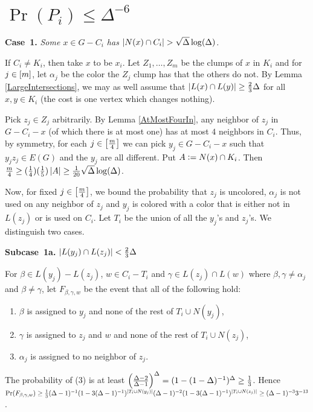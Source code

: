 \section{\texorpdfstring{$\Pr(P_i) \leq \Delta^{-6}$}{The P events}}
\textbf{Case~1.} \textit{Some $x \in G  - C_i$ has $\left|N(x) \cap C_i\right| >
\sqrt{\Delta}\log(\Delta)$.} 

If $C_i \neq K_i$, then take $x$ to be $x_i$. Let $Z_1, \ldots, Z_m$ be the
clumps of $x$ in $K_i$ and for $j \in \left[m\right]$, let $\alpha_j$ be the color
the $Z_j$ clump has that the others do not.  By Lemma \ref{LargeIntersections}, we may as well assume that $\left|L(x) \cap
L(y)\right| \geq \frac23 \Delta$ for all $x,y \in K_i$ (the cost is one vertex which
changes nothing).

Pick $z_j \in Z_j$ arbitrarily.  By Lemma \ref{AtMostFourIn}, any neighbor of
$z_j$ in $G - C_i - x$ (of which there is at most one) has at most $4$ neighbors
in $C_i$.  Thus, by symmetry, for each $j \in \left[\frac{m}{4}\right]$ we can pick
$y_j \in G - C_i - x$ such that $y_jz_j \in E(G)$ and the $y_j$ are all
different.  Put $A \mathrel{\mathop:}= N(x) \cap K_i$.  Then $\frac{m}{4} \geq
(\frac14)(\frac15)\left|A\right| \geq \frac{1}{20}\sqrt{\Delta}\log(\Delta)$.

Now, for fixed $j \in \left[\frac{m}{4}\right]$, we bound the probability that $z_j$
is uncolored, $\alpha_j$ is not used on any neighbor of $z_j$ and $y_j$ is colored
with a color that is either not in $L(z_j)$ or is used on $C_i$.  Let $T_i$ be
the union of all the $y_j$'s and $z_j$'s. We distinguish two cases.

\textbf{Subcase~1a.} \textit{$\left|L(y_j) \cap L(z_j)\right| < \frac23 \Delta$}

For $\beta \in L(y_j) - L(z_j)$, $w \in C_i - T_i$ and $\gamma \in L(z_j) \cap
L(w)$ where $\beta, \gamma \neq \alpha_j$ and $\beta \neq \gamma$, let
$F_{\beta, \gamma, w}$ be the event that all of the following hold:

\begin{enumerate}
  \item $\beta$ is assigned to $y_j$ and none of the rest of $T_i \cup N(y_j)$,
  \item $\gamma$ is assigned to $z_j$ and $w$ and none of the rest of $T_i \cup N(z_j)$,
  \item $\alpha_j$ is assigned to no neighbor of $z_j$.
\end{enumerate}

The probability of (3) is
at least $\left( \frac{\Delta - 2}{\Delta - 1} \right)^{\Delta} = (1 -
(1-\Delta)^{-1})^\Delta \geq \frac13$. Hence $\Pr(F_{\beta, \gamma, w}) \geq
\frac13 (\Delta-1)^{-1}(1-3(\Delta-1)^{-1})^{\left|T_i \cup
N(y_j)\right|}(\Delta-1)^{-2}(1 - 3(\Delta-1)^{-1})^{\left|T_i \cup N(z_j)\right|} \geq
(\Delta-1)^{-3}3^{-13}$.

